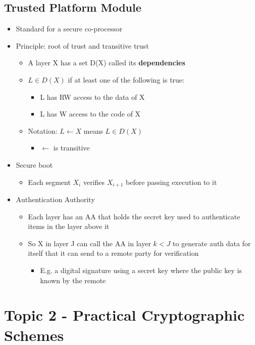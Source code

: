 \documentclass[11pt]{report}
\begin{document}
\section{Trusted Platform Module}
\begin{itemize}
	\item Standard for a secure co-processor
	\item Principle: root of trust and transitive trust
	\begin{itemize}
		\item A layer X has a set D(X) called its \textbf{dependencies}
		\item $L \in D(X)$ if at least one of the following is true:
		\begin{itemize}
			\item L has RW access to the data of X
			\item L has W access to the code of X
		\end{itemize}
		\item Notation: $L \xleftarrow{} X$ means $L \in D(X)$
		\begin{itemize}
			\item $\xleftarrow{}$ is transitive
		\end{itemize}
	\end{itemize}
	\item Secure boot
	\begin{itemize}
		\item Each segment $X_i$ verifies $X_{i+1}$ before passing execution to it
	\end{itemize}
	\item Authentication Authority
	\begin{itemize}
		\item Each layer has an AA that holds the secret key used to authenticate items in the layer above it
		\item So X in layer J can call the AA in layer $k < J$ to generate auth data for itself that it can send to a remote party for verification
		\begin{itemize}
			\item E.g. a digital signature using a secret key where the public key is known by the remote
		\end{itemize}
	\end{itemize}
\end{itemize}

\chapter{Topic 2 - Practical Cryptographic Schemes}
\end{document}
